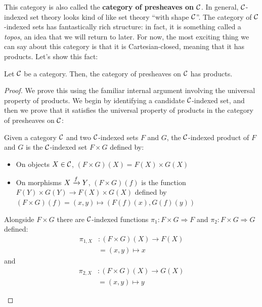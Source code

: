This category is also called the \textbf{category of presheaves on $\mathcal C$}.  In
general, \(\mathcal C\)-indexed set theory looks kind of like set theory ``with shape
\(\mathcal C\)''.
The category of $\mathcal C$-indexed sets has fantastically rich structure: in fact, 
it is something called a \emph{topos}, an idea that we will return to later. 
For now, the most exciting thing we can say about this category is that it 
is Cartesian-closed, meaning that it has products. 
Let's show this fact:
\begin{theorem}
  Let $\mathcal C$ be a category. Then, the category of presheaves on $\mathcal C$ 
  has products.
\end{theorem}
\begin{proof}
We prove this using the familiar internal argument involving the 
universal property of products.  
We begin by identifying a candidate $\mathcal C$-indexed set, 
and then we prove that it satisfies the universal property of products
in the category of presheaves on $\mathcal C$:

\begin{definition}
  \sloppy
  Given a category $\mathcal C$ and two \(\mathcal C\)-indexed sets $F$ and $G$,
  the $\mathcal C$-indexed product of $F$ and $G$
  is the \(\mathcal C\)-indexed set
  $F \times G$
  defined by:
  \begin{itemize}
    \item On objects $X \in \mathcal C$, $(F \times G)(X) = F(X) \times G(X)$
    \item On morphisms $X \xrightarrow{f} Y$,
    $(F \times G)(f)$ is the function $F(Y) \times G(Y) \to F(X) \times G(X)$
      defined by $(F \times G)(f) = (x,y) \mapsto (F(f)(x), G(f)(y))$
  \end{itemize}

  Alongside $F \times G$ there are $\mathcal C$-indexed functions $\pi_1 : F \times G \Rightarrow F$ 
  and $\pi_2 : F \times G \Rightarrow G$ defined:
  \begin{align*}
    \pi_{1, X} &: (F \times G)(X) \to F(X) \\
    &=(x, y) \mapsto x
  \end{align*}
  and
  \begin{align*}
    \pi_{2, X} &: (F \times G)(X) \to G(X) \\
    &=(x, y) \mapsto y
  \end{align*}



\end{definition} 


\end{proof}
